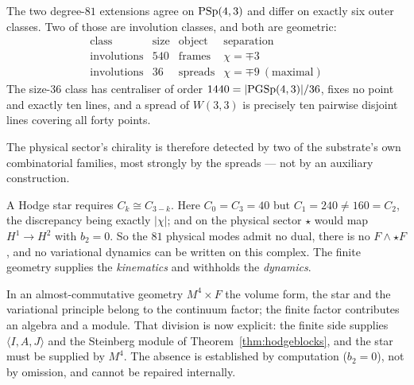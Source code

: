 \begin{proposition}
\label{prop:signgeometry}
The two degree-$81$ extensions agree on $\mathrm{PSp}(4,3)$ and differ on exactly six
outer classes. Two of those are involution classes, and both are geometric:
\[
\begin{array}{lccl}
\text{class} & \text{size} & \text{object} & \text{separation}\\\hline
\text{involutions} & 540 & \text{frames} & \chi=\mp3\\
\text{involutions} & 36 & \text{spreads} & \chi=\mp9 \ (\text{maximal})
\end{array}
\]
The size-$36$ class has centraliser of order $1440=|\mathrm{PGSp}(4,3)|/36$, fixes no
point and exactly ten lines, and a spread of $W(3,3)$ is precisely ten pairwise
disjoint lines covering all forty points.
\end{proposition}

The physical sector's chirality is therefore detected by two of the substrate's
own combinatorial families, most strongly by the spreads --- not by an auxiliary
construction.

\begin{remark}\label{rem:nostar}
A Hodge star requires $C_k\cong C_{3-k}$. Here $C_0=C_3=40$ but
$C_1=240\neq160=C_2$, the discrepancy being exactly $|\chi|$; and on the physical
sector $\star$ would map $H^1\to H^2$ with $b_2=0$. So the $81$ physical modes
admit no dual, there is no $F\wedge\star F$, and no variational dynamics can be
written on this complex. The finite geometry supplies the \emph{kinematics} and
withholds the \emph{dynamics}.

In an almost-commutative geometry $M^4\times F$ the volume form, the star and the
variational principle belong to the continuum factor; the finite factor
contributes an algebra and a module. That division is now explicit: the finite
side supplies $\langle I,A,J\rangle$ and the Steinberg module of
Theorem~\ref{thm:hodgeblocks}, and the star must be supplied by $M^4$. The
absence is established by computation ($b_2=0$), not by omission, and cannot be
repaired internally.
\end{remark}

